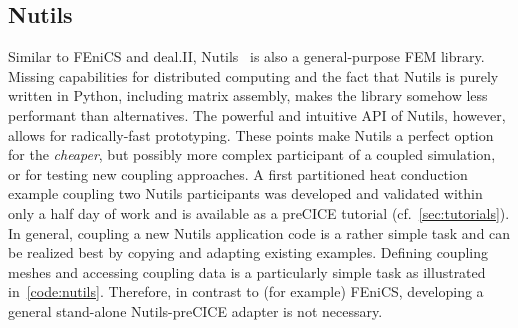 \subsection{Nutils} 

Similar to FEniCS and deal.II, Nutils~\cite{Nutils} is also a general-purpose FEM library. 
Missing capabilities for distributed computing and the fact that Nutils is purely written in Python, including matrix assembly, makes the library somehow less performant than alternatives. The powerful and intuitive API of Nutils, however, allows for radically-fast prototyping. These points make Nutils a perfect option for the \textit{cheaper}, but possibly more complex participant of a coupled simulation, or for testing new coupling approaches.
A first partitioned heat conduction example coupling two Nutils participants was developed and validated within only a half day of work and is available as a preCICE tutorial (cf.~\autoref{sec:tutorials}). 
In general, coupling a new Nutils application code is a rather simple task and can be realized best by copying and adapting existing examples.
Defining coupling meshes and accessing coupling data is a particularly simple task  as illustrated in~\autoref{code:nutils}.
Therefore, in contrast to (for example) FEniCS, developing a general stand-alone Nutils-preCICE adapter is not necessary. 




